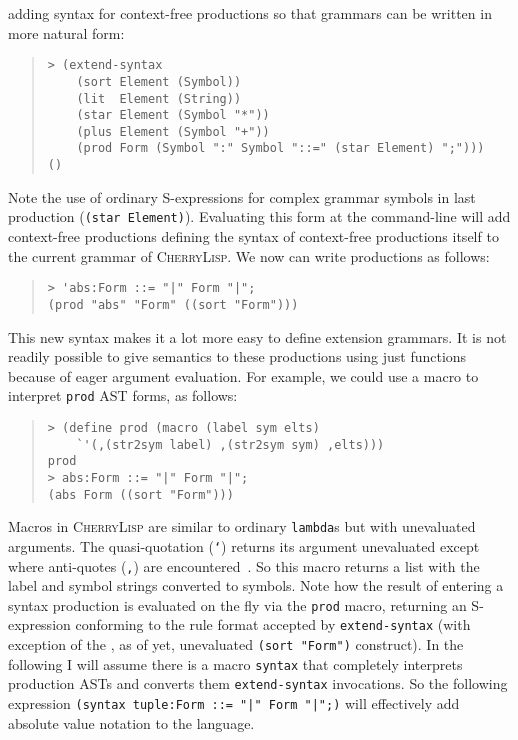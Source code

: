 \documentclass[a4paper]{llncs}
\def\cherrylisp{\textsc{CherryLisp}\xspace}
\begin{document}
adding syntax for context-free productions so that grammars can be
written in more natural form:
\begin{quote}
\begin{verbatim}
> (extend-syntax
    (sort Element (Symbol))
    (lit  Element (String))
    (star Element (Symbol "*"))
    (plus Element (Symbol "+"))
    (prod Form (Symbol ":" Symbol "::=" (star Element) ";")))
()
\end{verbatim}
\end{quote}
Note the use of ordinary S-expressions for complex grammar symbols in
last production (\texttt{(star Element)}).  Evaluating this form at
the command-line will add context-free productions defining the syntax
of context-free productions itself to the current grammar of
\cherrylisp. We now can write productions as follows:
\begin{quote}
\begin{verbatim}
> 'abs:Form ::= "|" Form "|";
(prod "abs" "Form" ((sort "Form")))
\end{verbatim}
\end{quote}
This new syntax makes it a lot more easy to define extension grammars.
It is not readily possible to give semantics to these productions
using just functions because of eager argument evaluation. For
example, we could use a macro to interpret \texttt{prod} AST forms, as
follows:
\begin{quote}
\begin{verbatim}
> (define prod (macro (label sym elts)  
    `'(,(str2sym label) ,(str2sym sym) ,elts)))
prod
> abs:Form ::= "|" Form "|";
(abs Form ((sort "Form")))
\end{verbatim}
\end{quote}
Macros in \cherrylisp are similar to ordinary \texttt{lambda}s but
with unevaluated arguments. The quasi-quotation (\texttt{`}) returns
its argument unevaluated except where anti-quotes (\texttt{,}) are
encountered~\cite{QuasiQuotation}. So this macro returns a list with
the label and symbol strings converted to symbols. Note how the result
of entering a syntax production is evaluated on the fly via the
\texttt{prod} macro, returning an S-expression conforming to the rule
format accepted by \texttt{extend-syntax} (with exception of the , as
of yet, unevaluated \texttt{(sort "Form")} construct). In the
following I will assume there is a macro \texttt{syntax} that
completely interprets production ASTs and converts them
\texttt{extend-syntax} invocations. So the following expression
\texttt{(syntax tuple:Form ::= "|" Form "|";)} will effectively add
absolute value notation to the language.
\end{document}
